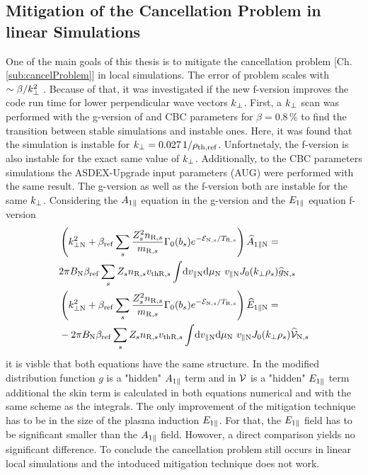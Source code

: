 \subsection{Mitigation of the Cancellation Problem in linear Simulations}
\label{sub:mitigationLinearFVersion}

One of the main goals of this thesis is to mitigate the cancellation problem [Ch. \ref{sub:cancelProblem}] in local simulations. The error of problem scales with $\sim \beta/k_\perp^2$ \cite{Mishchenko2017}. Because of that, it was investigated if the new f-version improves the code run time for lower perpendicular wave vectors $k_\perp$. First, a $k_\perp$ scan was performed with the g-version of {\gkw} and CBC parameters for $\beta = 0.8\,\%$ to find the transition between stable simulations and instable ones. Here, it was found that the simulation is instable for $k_\perp = 0.027\,1/\rho_{\mathrm{th},\mathrm{ref}}$. Unfortnetaly, the f-version is also instable for the exact same value of $k_\perp$. Additionally, to the CBC parameters simulations the ASDEX-Upgrade input parameters (AUG) were performed with the same result. The g-version as well as the f-version both are instable for the same $k_\perp$. Considering the $A_{1\parallel}$ equation in the g-version and the $E_{1\parallel}$ equation f-version
\begin{gather}
    \begin{aligned}
        &\left(k_{\perp \mathrm{N}}^2 + \beta_\mathrm{ref} \sum_s \frac{Z^2_sn_{\mathrm{R},s}}{m_{\mathrm{R},s}} \Gamma_0(b_s) e^{-\mathcal{E}_{\mathrm{N},s}/T_{\mathrm{R},s}} \right) \widehat{A}_{1\parallel \mathrm{N}} = \\
        & 2\pi B_\mathrm{N} \beta_\mathrm{ref} \sum_s Z_s n_{\mathrm{R},s} v_{\mathrm{th}\mathrm{R},s} \int \! \mathrm{d}v_{\parallel \mathrm{N}} \mathrm{d}\mu_\mathrm{N} ~ v_{\parallel \mathrm{N}} J_0(k_\perp \rho_s) \widehat{g}_{\mathrm{N},s}\\
        &\left(k_{\perp \mathrm{N}}^2 + \beta_\mathrm{ref} \sum_s \frac{Z^2_sn_{\mathrm{R},s}}{m_{\mathrm{R},s}} \Gamma_0(b_s) e^{-\mathcal{E}_{\mathrm{N},s}/T_{\mathrm{R},s}} \right) \widehat{E}_{1\parallel \mathrm{N}} = \\
        &- 2\pi B_\mathrm{N} \beta_\mathrm{ref} \sum_s Z_s n_{\mathrm{R},s} v_{\mathrm{th}\mathrm{R},s} \int \! \mathrm{d}v_{\parallel \mathrm{N}} \mathrm{d}\mu_\mathrm{N} ~ v_{\parallel \mathrm{N}} J_0(k_\perp \rho_s) \widehat{\mathcal{V}}_{\mathrm{N},s}
    \end{aligned}
    \label{eq:compareAparEpar}
\end{gather}
it is visble that both equations have the same structure. In the modified distribution function $g$ is a "hidden" $A_{1\parallel}$ term and in $\mathcal{V}$ is a "hidden" $E_{1\parallel}$ term additional the skin term is calculated in both equations numerical and with the same scheme as the integrals. The only improvement of the mitigation technique has to be in the size of the plasma induction $E_{1\parallel}$. For that, the $E_{1\parallel}$ field has to be significant smaller than the $A_{1\parallel}$ field. Howover, a direct comparison yields no significant difference. To conclude the cancellation problem still occurs in linear local simulations and the intoduced mitigation technique does not work.

